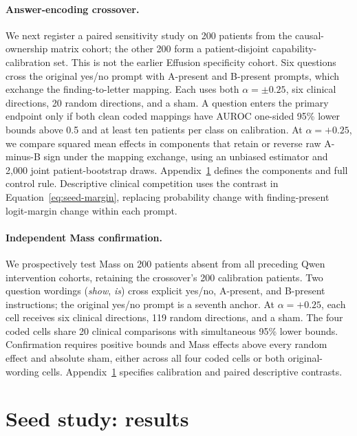 \documentclass{article}
\begin{document}
\paragraph{Answer-encoding crossover.}
We next register a paired sensitivity study on 200 patients from the causal-ownership matrix cohort; the other 200 form a patient-disjoint capability-calibration set. This is not the earlier Effusion specificity cohort. Six questions cross the original yes/no prompt with A-present and B-present prompts, which exchange the finding-to-letter mapping. Each uses both $\alpha=\pm0.25$, six clinical directions, 20 random directions, and a sham. A question enters the primary endpoint only if both clean coded mappings have AUROC one-sided 95\% lower bounds above 0.5 and at least ten patients per class on calibration. At $\alpha=+0.25$, we compare squared mean effects in components that retain or reverse raw A-minus-B sign under the mapping exchange, using an unbiased estimator and 2,000 joint patient-bootstrap draws. Appendix~\ref{app:seed-results} defines the components and full control rule. Descriptive clinical competition uses the contrast in Equation~\ref{eq:seed-margin}, replacing probability change with finding-present logit-margin change within each prompt.

\paragraph{Independent Mass confirmation.}
We prospectively test Mass on 200 patients absent from all preceding Qwen intervention cohorts, retaining the crossover's 200 calibration patients. Two question wordings (\textit{show}, \textit{is}) cross explicit yes/no, A-present, and B-present instructions; the original yes/no prompt is a seventh anchor. At $\alpha=+0.25$, each cell receives six clinical directions, 119 random directions, and a sham. The four coded cells share 20 clinical comparisons with simultaneous 95\% lower bounds. Confirmation requires positive bounds and Mass effects above every random effect and absolute sham, either across all four coded cells or both original-wording cells. Appendix~\ref{app:seed-results} specifies calibration and paired descriptive contrasts.

\section{Seed study: results}
\label{app:seed-results}
\end{document}
